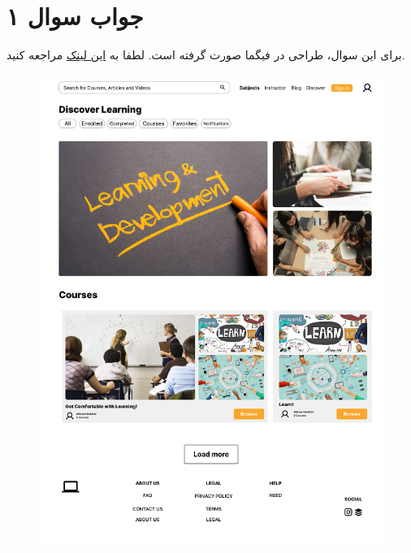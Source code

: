 \section*{جواب سوال ۱}

برای این سوال، طراحی در فیگما صورت گرفته است. لطفا به \href{https://www.figma.com/file/j9DWRQmEEL1pcwmt5AWs4E/HW3?type=design&node-id=0%3A1&mode=design&t=lIFq8iezIYotDbWQ-1}
{این لینک} مراجعه کنید.

\begin{figure}[H]
	\centering
	\includegraphics{Frame 1.png}
	
	\label{fig:label4}
\end{figure}

\newpage

